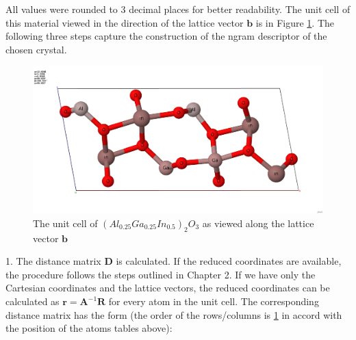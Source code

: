 \documentclass[11pt,oneside,czech,american]{book} %
\theoremstyle{definition} %
\theoremstyle{definition}
\begin{document}
All values were rounded to 3 decimal places for better readability. The unit cell of this material viewed in the direction of the lattice vector $\bm{b}$ is in Figure \ref{example}. The following three steps capture the construction of the ngram descriptor of the chosen crystal.
\begin{figure}[h]
	\centering
	\includegraphics[scale=0.23]{train_id_20_final_hotovo.png}
	\caption{The unit cell of $(Al_{0.25}Ga_{0.25}In_{0.5})_2 O_3$ as viewed along the lattice vector $\bm{b}$ \parencite{jmol}}
	\label{example}
\end{figure}

1. The distance matrix $\bm{D}$ is calculated. If the reduced coordinates are available, the procedure follows the steps outlined in Chapter 2. If we have only the Cartesian coordinates and the lattice vectors, the reduced coordinates can be calculated as $\bm{r} = \bm{A}^{-1} \bm{R}$ for every atom in the unit cell. The corresponding distance matrix has the form (the order of the rows/columns is \ref{example} in accord with the position of the atoms tables above):
\end{document}
